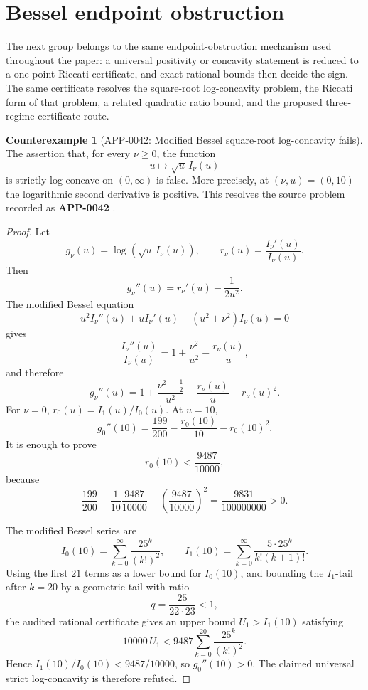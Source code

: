 \documentclass[11pt]{article}
\numberwithin{equation}{section}
\theoremstyle{definition}
\newtheorem{counterexample}[theorem]{Counterexample}
\theoremstyle{remark}
\newcommand{\1}{\mathbf 1}
\begin{document}
\section{Bessel endpoint obstruction}
\label{sec:bessel-endpoint-obstruction}

The next group belongs to the same endpoint-obstruction mechanism used throughout the paper: a universal positivity or concavity statement is reduced to a one-point Riccati certificate, and exact rational bounds then decide the sign.  The same certificate resolves the square-root log-concavity problem, the Riccati form of that problem, a related quadratic ratio bound, and the proposed three-regime certificate route.

\begin{counterexample}[APP-0042: Modified Bessel square-root log-concavity fails]
\label{res:not-bessel-i-sqrt-log-concavity-nu-ge-0}
The assertion that, for every \(\nu\ge0\), the function
\[
u\longmapsto \sqrt{u}\,I_\nu(u)
\]
is strictly log-concave on \((0,\infty)\) is false.  More precisely, at \((\nu,u)=(0,10)\) the logarithmic second derivative is positive.  This resolves the source problem recorded as \textbf{APP-0042} \cite{app-app-0042-source}.
\end{counterexample}

\begin{proof}
Let
\[
g_\nu(u)=\log(\sqrt u\,I_\nu(u)),
\qquad
r_\nu(u)=\frac{I_\nu'(u)}{I_\nu(u)}.
\]
Then
\[
g_\nu''(u)=r_\nu'(u)-\frac{1}{2u^2}.
\]
The modified Bessel equation
\[
u^2I_\nu''(u)+uI_\nu'(u)-(u^2+\nu^2)I_\nu(u)=0
\]
gives
\[
\frac{I_\nu''(u)}{I_\nu(u)}
=1+\frac{\nu^2}{u^2}-\frac{r_\nu(u)}{u},
\]
and therefore
\[
g_\nu''(u)
=
1+\frac{\nu^2-\frac12}{u^2}
-\frac{r_\nu(u)}{u}
-r_\nu(u)^2.
\]
For \(\nu=0\), \(r_0(u)=I_1(u)/I_0(u)\).  At \(u=10\),
\[
g_0''(10)=\frac{199}{200}-\frac{r_0(10)}{10}-r_0(10)^2.
\]
It is enough to prove
\[
r_0(10)<\frac{9487}{10000},
\]
because
\[
\frac{199}{200}
-\frac{1}{10}\frac{9487}{10000}
-\left(\frac{9487}{10000}\right)^2
=\frac{9831}{100000000}>0.
\]

The modified Bessel series are
\[
I_0(10)=\sum_{k=0}^\infty\frac{25^k}{(k!)^2},
\qquad
I_1(10)=\sum_{k=0}^\infty\frac{5\cdot25^k}{k!(k+1)!}.
\]
Using the first \(21\) terms as a lower bound for \(I_0(10)\), and bounding the \(I_1\)-tail after \(k=20\) by a geometric tail with ratio
\[
q=\frac{25}{22\cdot23}<1,
\]
the audited rational certificate gives an upper bound \(U_1>I_1(10)\) satisfying
\[
10000\,U_1<9487\sum_{k=0}^{20}\frac{25^k}{(k!)^2}.
\]
Hence \(I_1(10)/I_0(10)<9487/10000\), so \(g_0''(10)>0\).  The claimed universal strict log-concavity is therefore refuted.
\end{proof}
\end{document}
